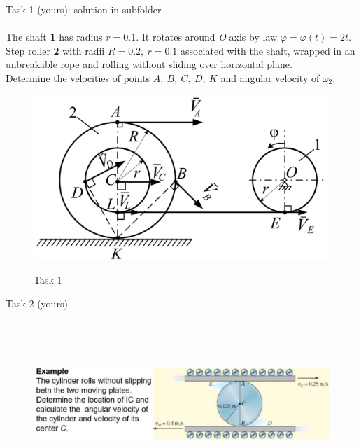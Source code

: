 \documentclass[aspectratio=169]{beamer}
\begin{document}
\begin{frame}[t]{Task 1 (yours): solution in subfolder}
    \framesubtitle{}
\begin{minipage}{0.5\textwidth}
The shaft \textbf{1} has radius $r = 0.1$. It rotates around \textit{O} axis by law $\varphi  = \varphi(t) = 2t $. Step roller \textbf{2} with radii $R = 0.2,\ r= 0.1$ associated with the shaft, wrapped in an unbreakable rope and rolling without sliding over horizontal plane. \\

Determine the velocities of points $A,\ B,\ C,\ D,\ K$ and angular velocity of $\omega_2$. 
\end{minipage}
\begin{minipage}{0.45\textwidth}
      \begin{figure}[H]
    \includegraphics[width=0.99\textwidth]{lab3_task1_fig.png}\\
    \caption*{Task 1}
    \end{figure}
\end{minipage}
\end{frame}

\begin{frame}[c]{Task 2 (yours)
    }
\framesubtitle{}
    \vspace{-0.6cm}
    \begin{figure}[H]
        \centering\includegraphics[height=6cm,width=1\textwidth,keepaspectratio]{image24.png}
        \label{fig:image24}
    \end{figure}
\end{frame}
\end{document}
